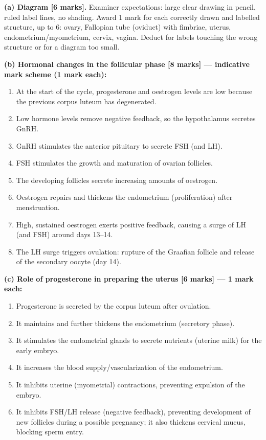 \documentclass[11pt]{article}
\begin{document}
\begin{corrige}
\textbf{(a) Diagram [6 marks].} Examiner expectations: large clear drawing in pencil, ruled label lines, no shading. Award 1 mark for each correctly drawn and labelled structure, up to 6: ovary, Fallopian tube (oviduct) with fimbriae, uterus, endometrium/myometrium, cervix, vagina. Deduct for labels touching the wrong structure or for a diagram too small.

\textbf{(b) Hormonal changes in the follicular phase [8 marks] — indicative mark scheme (1 mark each):}
\begin{enumerate}
\item At the start of the cycle, progesterone and oestrogen levels are low because the previous corpus luteum has degenerated.
\item Low hormone levels remove negative feedback, so the hypothalamus secretes GnRH.
\item GnRH stimulates the anterior pituitary to secrete FSH (and LH).
\item FSH stimulates the growth and maturation of ovarian follicles.
\item The developing follicles secrete increasing amounts of oestrogen.
\item Oestrogen repairs and thickens the endometrium (proliferation) after menstruation.
\item High, sustained oestrogen exerts positive feedback, causing a surge of LH (and FSH) around days 13–14.
\item The LH surge triggers ovulation: rupture of the Graafian follicle and release of the secondary oocyte (day 14).
\end{enumerate}

\textbf{(c) Role of progesterone in preparing the uterus [6 marks] — 1 mark each:}
\begin{enumerate}
\item Progesterone is secreted by the corpus luteum after ovulation.
\item It maintains and further thickens the endometrium (secretory phase).
\item It stimulates the endometrial glands to secrete nutrients (uterine milk) for the early embryo.
\item It increases the blood supply/vascularization of the endometrium.
\item It inhibits uterine (myometrial) contractions, preventing expulsion of the embryo.
\item It inhibits FSH/LH release (negative feedback), preventing development of new follicles during a possible pregnancy; it also thickens cervical mucus, blocking sperm entry.
\end{enumerate}
\end{corrige}
\end{document}
